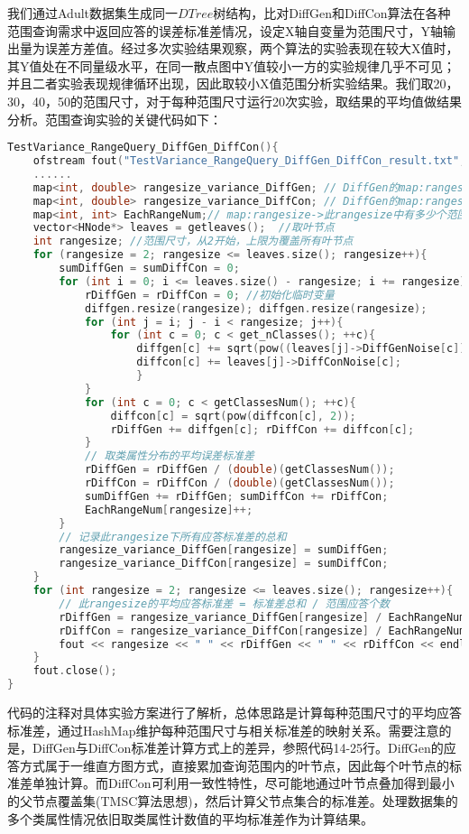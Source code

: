 我们通过Adult数据集生成同一$DTree$树结构，比对DiffGen和DiffCon算法在各种范围查询需求中返回应答的误差标准差情况，设定X轴自变量为范围尺寸，Y轴输出量为误差方差值。经过多次实验结果观察，两个算法的实验表现在较大X值时，其Y值处在不同量级水平，在同一散点图中Y值较小一方的实验规律几乎不可见；并且二者实验表现规律循环出现，因此取较小X值范围分析实验结果。我们取20，30，40，50的范围尺寸，对于每种范围尺寸运行20次实验，取结果的平均值做结果分析。范围查询实验的关键代码如下：
\begin{lstlisting}[language={C++}, caption={范围查询实验}]
TestVariance_RangeQuery_DiffGen_DiffCon(){
	ofstream fout("TestVariance_RangeQuery_DiffGen_DiffCon_result.txt", ios::app);
	......
	map<int, double> rangesize_variance_DiffGen; // DiffGen的map:rangesize->标准差总和
	map<int, double> rangesize_variance_DiffCon; // DiffGen的map:rangesize->标准差总和
	map<int, int> EachRangeNum;// map:rangesize->此rangesize中有多少个范围应答标准差相加
	vector<HNode*> leaves = getleaves();  //取叶节点
	int rangesize; //范围尺寸，从2开始，上限为覆盖所有叶节点
	for (rangesize = 2; rangesize <= leaves.size(); rangesize++){
		sumDiffGen = sumDiffCon = 0;
		for (int i = 0; i <= leaves.size() - rangesize; i += rangesize){
			rDiffGen = rDiffCon = 0; //初始化临时变量
			diffgen.resize(rangesize); diffgen.resize(rangesize);
			for (int j = i; j - i < rangesize; j++){
				for (int c = 0; c < get_nClasses(); ++c){
					diffgen[c] += sqrt(pow((leaves[j]->DiffGenNoise[c]), 2));
					diffcon[c] += leaves[j]->DiffConNoise[c];
					}	
			}
			for (int c = 0; c < getClassesNum(); ++c){
				diffcon[c] = sqrt(pow(diffcon[c], 2));
				rDiffGen += diffgen[c]; rDiffCon += diffcon[c];
			}
			// 取类属性分布的平均误差标准差
			rDiffGen = rDiffGen / (double)(getClassesNum());
			rDiffCon = rDiffCon / (double)(getClassesNum());
			sumDiffGen += rDiffGen;	sumDiffCon += rDiffCon;
			EachRangeNum[rangesize]++;
		}
		// 记录此rangesize下所有应答标准差的总和
		rangesize_variance_DiffGen[rangesize] = sumDiffGen;
		rangesize_variance_DiffCon[rangesize] = sumDiffCon;
	}
	for (int rangesize = 2; rangesize <= leaves.size(); rangesize++){
		// 此rangesize的平均应答标准差 = 标准差总和 / 范围应答个数
		rDiffGen = rangesize_variance_DiffGen[rangesize] / EachRangeNum[rangesize];
		rDiffCon = rangesize_variance_DiffCon[rangesize] / EachRangeNum[rangesize];
		fout << rangesize << " " << rDiffGen << " " << rDiffCon << endl; // 写入文件
	}
	fout.close();
}
\end{lstlisting}
代码的注释对具体实验方案进行了解析，总体思路是计算每种范围尺寸的平均应答标准差，通过HashMap维护每种范围尺寸与相关标准差的映射关系。需要注意的是，DiffGen与DiffCon标准差计算方式上的差异，参照代码14-25行。DiffGen的应答方式属于一维直方图方式，直接累加查询范围内的叶节点，因此每个叶节点的标准差单独计算。而DiffCon可利用一致性特性，尽可能地通过叶节点叠加得到最小的父节点覆盖集(TMSC算法思想)，然后计算父节点集合的标准差。处理数据集的多个类属性情况依旧取类属性计数值的平均标准差作为计算结果。


